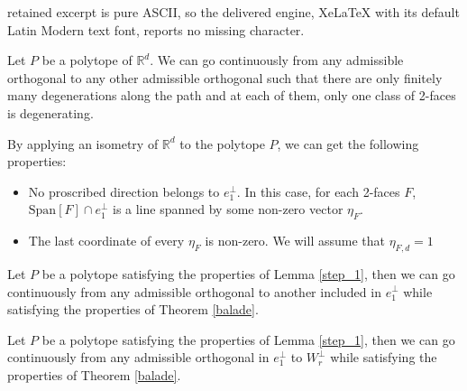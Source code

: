 \documentclass[10pt,a4paper]{amsart}
\newcommand{\R}{\mathbb R}
\newcommand{\vect}{\text{Span}}
\begin{document}
retained excerpt is pure ASCII, so the delivered engine, XeLaTeX with its default Latin Modern text font, reports no missing character.
\begin{thm}
\label{balade}
    Let $P$ be a polytope of $\R^d$. We can go continuously from any admissible orthogonal to any other admissible orthogonal such that there are only finitely many degenerations along the path and at each of them, only one class of 2-faces is degenerating.
\end{thm}

\begin{lemma}
\label{step_1}
    By applying an isometry of $\R^d$ to the polytope $P$, we can get the following properties:
    \begin{itemize}
        \item No proscribed direction belongs to $e_1^\perp$. In this case, for each 2-faces $F$, $\vect[F]\cap e_1^\perp$ is a line spanned by some non-zero vector $\eta_F$.
        \item  The last coordinate of every $\eta_F$ is non-zero. We will assume that $\eta_{F,d}=1$
    \end{itemize}
\end{lemma}

\begin{lemma}
\label{step_2}
Let $P$ be a polytope satisfying the properties of Lemma \ref{step_1}, then we can go continuously from any admissible orthogonal to another included in $e_1^\perp$ while satisfying the properties of Theorem \ref{balade}.
\end{lemma}

\begin{lemma}
\label{step_3}
    Let $P$ be a polytope satisfying the properties of Lemma \ref{step_1}, then we can go continuously from any admissible orthogonal in $e_1^\perp$ to $W_r^\perp$ while satisfying the properties of Theorem \ref{balade}.
\end{lemma}
\end{document}
